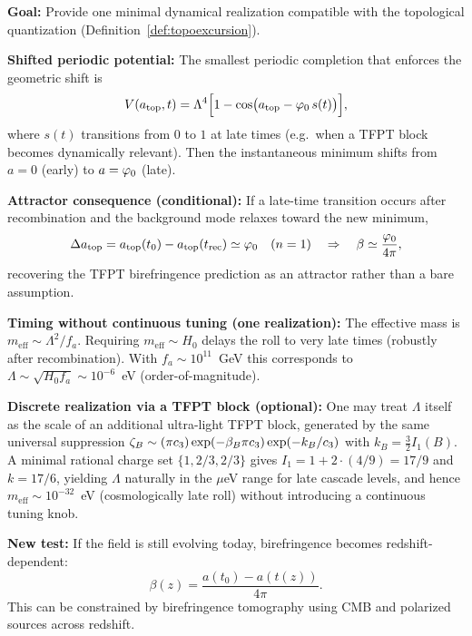 \begin{tcolorbox}[colback=red!3, colframe=red!50!black, 
    title={\textbf{One Minimal Dynamical Realization: Late-Time Shifted Axion Attractor}}, fonttitle=\bfseries\small]
\textbf{Goal:} Provide one minimal dynamical realization compatible with the topological quantization (Definition~\ref{def:topoexcursion}).

\textbf{Shifted periodic potential:} The smallest periodic completion that enforces the geometric shift is
\begin{equation}
    V(a_{\text{top}},t)=\Lambda^4\Bigl[1-\cos\bigl(a_{\text{top}}-\varphi_0\,s(t)\bigr)\Bigr],
    \label{eq:shifted-axion-potential}
\end{equation}
where $s(t)$ transitions from $0$ to $1$ at late times (e.g.\ when a TFPT block becomes dynamically relevant).
Then the instantaneous minimum shifts from $a=0$ (early) to $a=\varphi_0$ (late).

\textbf{Attractor consequence (conditional):} If a late-time transition occurs after recombination and the background mode relaxes toward the new minimum,
\begin{equation}
    \Delta a_{\text{top}} = a_{\text{top}}(t_0)-a_{\text{top}}(t_{\mathrm{rec}}) \simeq \varphi_0 \quad (n=1)
    \quad\Rightarrow\quad
    \beta \simeq \frac{\varphi_0}{4\pi},
\end{equation}
recovering the TFPT birefringence prediction as an attractor rather than a bare assumption.

\textbf{Timing without continuous tuning (one realization):} The effective mass is $m_{\mathrm{eff}}\sim \Lambda^2/f_a$.
Requiring $m_{\mathrm{eff}}\sim H_0$ delays the roll to very late times (robustly after recombination). With $f_a\sim 10^{11}$~GeV this corresponds to
$\Lambda\sim \sqrt{H_0 f_a}\sim 10^{-6}$~eV (order-of-magnitude).

\textbf{Discrete realization via a TFPT block (optional):} One may treat $\Lambda$ itself as the scale of an additional ultra-light TFPT block,
generated by the same universal suppression $\zeta_B \sim (\pi c_3)\exp(-\beta_B\pi c_3)\exp(-k_B/c_3)$ with $k_B=\frac{3}{2}I_1(B)$.
A minimal rational charge set $\{1,2/3,2/3\}$ gives $I_1=1+2\cdot(4/9)=17/9$ and $k=17/6$, yielding $\Lambda$ naturally in the $\mu$eV range for late cascade levels,
and hence $m_{\mathrm{eff}}\sim 10^{-32}$~eV (cosmologically late roll) without introducing a continuous tuning knob.

\textbf{New test:} If the field is still evolving today, birefringence becomes redshift-dependent:
\begin{equation}
    \beta(z)=\frac{a(t_0)-a(t(z))}{4\pi}.
\end{equation}
This can be constrained by birefringence tomography using CMB and polarized sources across redshift.
\end{tcolorbox}

